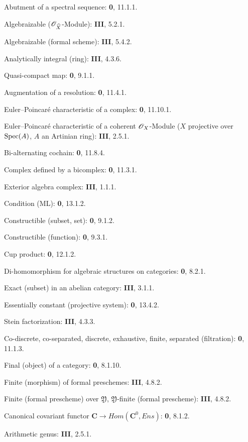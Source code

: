 \begin{flushleft}
Abutment of a spectral sequence: \textbf{0}, 11.1.1.

Algebraizable ($\mathscr{O}_{\widehat X}$-Module): \textbf{III}, 5.2.1.

Algebraizable (formal scheme): \textbf{III}, 5.4.2.

Analytically integral (ring): \textbf{III}, 4.3.6.

Quasi-compact map: \textbf{0}, 9.1.1.

Augmentation of a resolution: \textbf{0}, 11.4.1.

Euler--Poincaré characteristic of a complex: \textbf{0}, 11.10.1.

Euler--Poincaré characteristic of a coherent $\mathscr{O}_X$-Module
($X$ projective over $\operatorname{Spec}(A)$, $A$ an Artinian ring): \textbf{III}, 2.5.1.

Bi-alternating cochain: \textbf{0}, 11.8.4.

Complex defined by a bicomplex: \textbf{0}, 11.3.1.

Exterior algebra complex: \textbf{III}, 1.1.1.

Condition (ML): \textbf{0}, 13.1.2.

Constructible (subset, set): \textbf{0}, 9.1.2.

Constructible (function): \textbf{0}, 9.3.1.

Cup product: \textbf{0}, 12.1.2.

Di-homomorphism for algebraic structures on categories: \textbf{0}, 8.2.1.

Exact (subset) in an abelian category: \textbf{III}, 3.1.1.

Essentially constant (projective system): \textbf{0}, 13.4.2.

Stein factorization: \textbf{III}, 4.3.3.

Co-discrete, co-separated, discrete, exhaustive, finite, separated
(filtration): \textbf{0}, 11.1.3.

Final (object) of a category: \textbf{0}, 8.1.10.

Finite (morphism) of formal preschemes: \textbf{III}, 4.8.2.

Finite (formal prescheme) over $\mathfrak Y$,
$\mathfrak Y$-finite (formal prescheme): \textbf{III}, 4.8.2.

Canonical covariant functor $\boldsymbol{C}\to\boldsymbol{\mathit{Hom}}(\boldsymbol{C}^0,\boldsymbol{\mathit{Ens}})$: \textbf{0}, 8.1.2.

Arithmetic genus: \textbf{III}, 2.5.1.


\end{flushleft}
